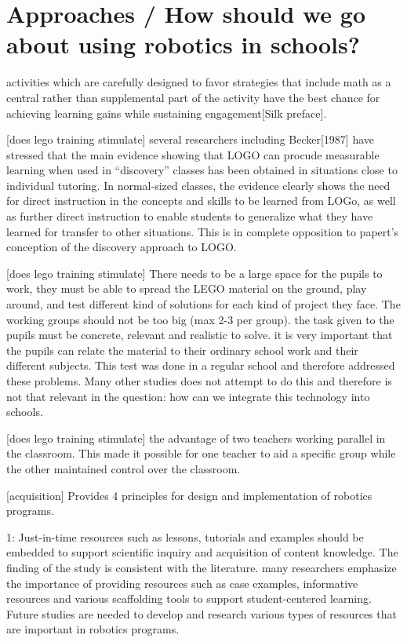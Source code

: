 \section{Approaches / How should we go about using robotics in schools?}
activities which are carefully designed to favor strategies that include math as a central rather than supplemental part of the activity have the best chance for achieving learning gains while sustaining engagement[Silk preface]. 

[does lego training stimulate] several researchers including Becker[1987] have stressed that the main evidence showing that LOGO can procude measurable learning when used in "`discovery"' classes has been obtained in situations close to individual tutoring. In normal-sized classes, the evidence clearly shows the need for direct instruction in the concepts and skills to be learned from LOGo, as well as further direct instruction to enable students to generalize what they have learned for transfer to other situations. This is in complete opposition to papert's conception of the discovery approach to LOGO.

[does lego training stimulate] There needs to be a large space for the pupils to work, they must be able to spread the LEGO material on the ground, play around, and test different kind of solutions for each kind of project they face. The working groups should not be too big (max 2-3 per group). the task given to the pupils must be concrete, relevant and realistic to solve. it is very important that the pupils can relate the material to their ordinary school work and their different subjects. This test was done in a regular school and therefore addressed these problems. Many other studies does not attempt to do this and therefore is not that relevant in the question: how can we integrate this technology into schools. 

[does lego training stimulate] the advantage of two teachers working parallel in the classroom. This made it possible for one teacher to aid a specific group while the other maintained control over the classroom. 

[acquisition] Provides 4 principles for design and implementation of robotics programs. 

1: Just-in-time resources such as lessons, tutorials and examples should be embedded to support scientific inquiry and acquisition of content knowledge. The finding of the study is consistent with the literature. many researchers emphasize the importance of providing resources such as case examples, informative resources and various scaffolding tools to support student-centered learning. Future studies are needed to develop and research various types of resources that are important in robotics programs. 

